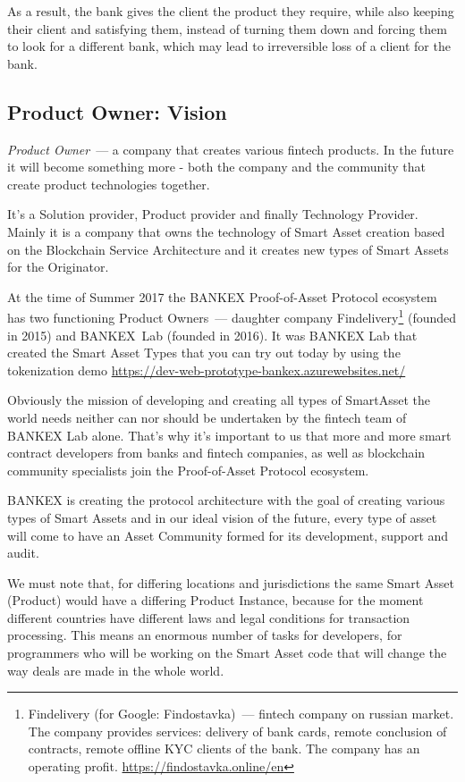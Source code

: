 \documentclass{article}
\begin{document}
\begin{multicols}{2}
As a result, the bank gives the client the product they require, while also keeping their client and satisfying them, instead of turning them down and forcing them to look for a different bank, which may lead to irreversible loss of a client for the bank.

\subsection{Product Owner: Vision}

\textit{Product Owner}~--- a company that creates various fintech products. In the future it will become something more - both the company and the community that create product technologies together.

It's a Solution provider, Product provider and finally Technology Provider. 
Mainly it is a company that owns the technology of Smart Asset creation based on the Blockchain Service Architecture and it creates new types of Smart Assets for the Originator.

At the time of Summer 2017 the BANKEX Proof-of-Asset Protocol ecosystem has two functioning Product Owners~--- daughter company Findelivery\footnote{Findelivery (for Google: Findostavka)~--- fintech company on russian market. The company provides services: delivery of bank cards, remote conclusion of contracts, remote offline KYC clients of the bank. The company has an operating profit. \url{https://findostavka.online/en}} (founded in 2015) and BANKEX~Lab (founded in 2016). It was BANKEX Lab that created the Smart Asset Types that you can try out today by using the tokenization demo \url{https://dev-web-prototype-bankex.azurewebsites.net/}

Obviously the mission of developing and creating all types of SmartAsset the world needs neither can nor should be undertaken by the fintech team of BANKEX Lab alone. That’s why it’s important to us that more and more smart contract developers from banks and fintech companies, as well as blockchain community specialists join the Proof-of-Asset Protocol ecosystem.

BANKEX is creating the protocol architecture with the goal of creating various types of Smart Assets and in our ideal vision of the future, every type of asset will come to have an Asset Community formed for its development, support and audit.

We must note that, for differing locations and jurisdictions the same Smart Asset (Product) would have a differing Product Instance, because for the moment different countries have different laws and legal conditions for transaction processing. This means an enormous number of tasks for developers, for programmers who will be working on the Smart Asset code that will change the way deals are made in the whole world.


\end{multicols}
\end{document}
